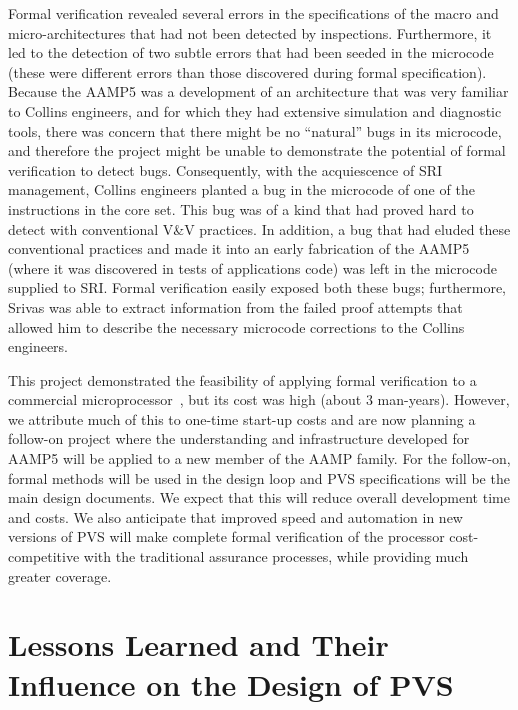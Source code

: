 Formal verification revealed several errors in the specifications of
the macro and micro-architectures that had not been detected by
inspections.  Furthermore, it led to the detection of two subtle
errors that had been seeded in the microcode (these were different
errors than those discovered during formal specification).
Because the AAMP5 was
a development of an architecture that was very familiar to Collins
engineers, and for which they had extensive simulation and diagnostic
tools, there was concern that there might be no ``natural'' bugs in
its microcode, and therefore the project might be unable to
demonstrate the potential of formal verification to detect bugs.
Consequently, with the acquiescence of SRI management, Collins
engineers planted a bug in the microcode of one of the instructions in
the core set.  This bug was of a kind that had proved hard to detect
with conventional V\&V practices.  In addition, a bug that had eluded
these conventional practices and made it into an early fabrication of
the AAMP5 (where it was discovered in tests of applications code)
was left in the microcode supplied to SRI\@.  Formal verification
easily exposed both these bugs; furthermore, Srivas was able to
extract information from the failed proof attempts that allowed him to
describe the necessary microcode corrections to the Collins engineers.

This project demonstrated the feasibility of applying formal
verification to a commercial microprocessor~\cite{Miller&Srivas95},
but its cost was high (about 3 man-years).  However, we attribute much
of this to one-time start-up costs and are now planning a follow-on
project where the understanding and infrastructure developed for
AAMP5 will be applied to a new member of the AAMP family.  For the
follow-on, formal methods will be used in the design loop and PVS
specifications will be the main design documents.  We expect that this
will reduce overall development time and costs.  We also anticipate
that improved speed and automation in new versions of PVS will make
complete formal verification of the processor cost-competitive with
the traditional assurance processes, while providing much greater
coverage.

\section{Lessons Learned and Their Influence on the Design of PVS}
\label{three}

